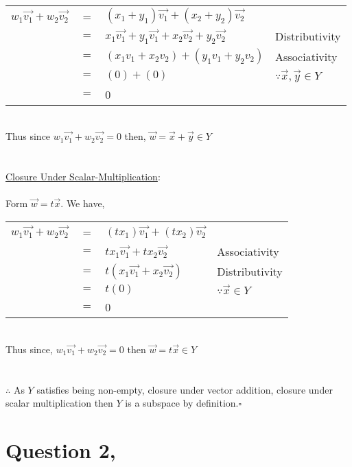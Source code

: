 \documentclass{article}
\begin{document}
 \begin{table}[htp]
     \centering
     \begin{tabular}{lcll}
         $w_1\vec{v_1}+w_2\vec{v_2}$ &=& $(x_1+y_1)\vec{v_1}+(x_2+y_2)\vec{v_2}$ & \\
          & $=$ & $x_1\vec{v_1}+y_1\vec{v_1}+x_2\vec{v_2}+y_2\vec{v_2}$ & Distributivity\\
          & $=$ & $(x_1v_1+x_2v_2)+(y_1v_1+y_2v_2)$ & Associativity\\
          & $=$ & $(0)+(0)$ & $\because \vec{x},\vec{y}\in Y$\\
          & $=$ & 0 &
     \end{tabular}
 \end{table} \\
 Thus since $w_1\vec{v_1}+w_2\vec{v_2}=0$ then, $\vec{w}=\vec{x}+\vec{y}\in Y$
 \\\\\\
 \underline{Closure Under Scalar-Multiplication}:\\\\
Form $\vec{w}=t\vec{x}$. We have,
 \begin{table}[htp]
     \centering
     \begin{tabular}{lcll}
         $w_1\vec{v_1}+w_2\vec{v_2}$ &=& $(tx_1)\vec{v_1}+(tx_2)\vec{v_2}$ & \\
          & $=$ & $tx_1\vec{v_1}+tx_2\vec{v_2}$ & Associativity\\
          & $=$ & $t(x_1\vec{v_1}+x_2\vec{v_2})$ & Distributivity\\
          & $=$ & $t(0)$ & $\because \vec{x}\in Y$\\
          & $=$ & 0 &
     \end{tabular}
 \end{table} \\
 Thus since, $w_1\vec{v_1}+w_2\vec{v_2}=0$ then $\vec{w}=t\vec{x}\in Y$\\\\\\
 $\therefore$ As $Y$ satisfies being non-empty, closure under vector addition, closure under scalar multiplication then $Y$ is a subspace by definition.\;\;$\square$
 \newpage
 \section*{Question 2,}
\end{document}
